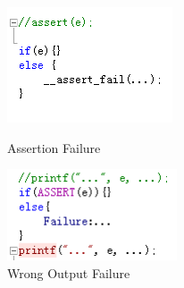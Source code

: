 \begin{figure}
\begin{minipage}[t]{0.52\linewidth}
\centering
\includegraphics[width=\textwidth]{body/assertion.png}
\caption{Assertion Failure}
\label {AF}
\end{minipage}%
\begin{minipage}[t]{0.52\linewidth}
\centering
\includegraphics[width=\textwidth]{body/wrong_output.png}
\caption{Wrong Output Failure}
\label{WO}
\end{minipage}
\end{figure}

